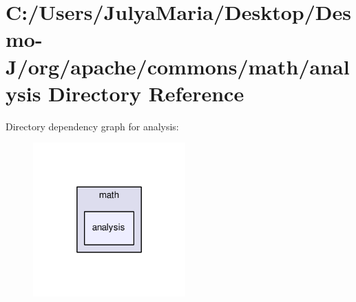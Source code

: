 \section{C\-:/\-Users/\-Julya\-Maria/\-Desktop/\-Desmo-\/\-J/org/apache/commons/math/analysis Directory Reference}
\label{dir_008df3eb0f7602bab0e48d90e22de883}
Directory dependency graph for analysis\-:
\nopagebreak
\begin{figure}[H]
\begin{center}
\leavevmode
\includegraphics[width=166pt]{dir_008df3eb0f7602bab0e48d90e22de883_dep}
\end{center}
\end{figure}
